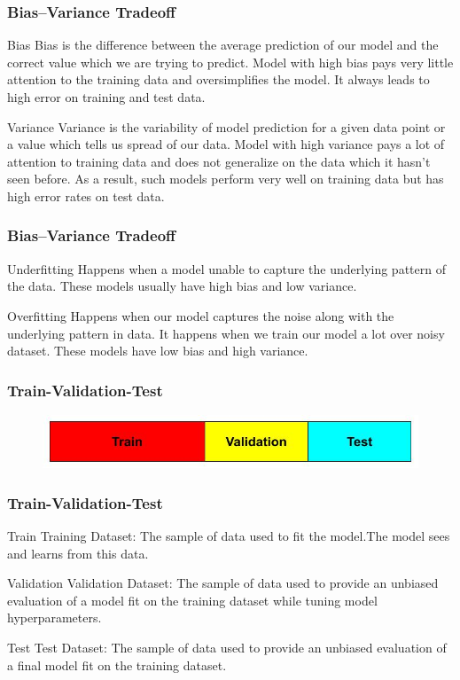 \documentclass{beamer}
\begin{document}
\begin{frame}
\frametitle{Bias–Variance Tradeoff}
\begin{block}{Bias}
Bias is the difference between the average prediction of our model and the correct value which we are trying to predict. Model with high bias pays very little attention to the training data and oversimplifies the model. It always leads to high error on training and test data.
\end{block}
\begin{block}{Variance}
Variance is the variability of model prediction for a given data point or a value which tells us spread of our data. Model with high variance pays a lot of attention to training data and does not generalize on the data which it hasn’t seen before. As a result, such models perform very well on training data but has high error rates on test data.
\end{block}
\end{frame}
\begin{frame}
\frametitle{Bias–Variance Tradeoff}
\begin{block}{Underfitting}
Happens when a model unable to capture the underlying pattern of the data. These models usually have high bias and low variance.
\end{block}
\begin{block}{Overfitting}
Happens when our model captures the noise along with the underlying pattern in data. It happens when we train our model a lot over noisy dataset. These models have low bias and high variance.
\end{block}
\end{frame}

\begin{frame}
\frametitle{Train-Validation-Test}
\begin{figure}[h]
 \centering
 \includegraphics[scale=0.3]{train-test.jpg}
\end{figure}
\end{frame}
\begin{frame}
\frametitle{Train-Validation-Test}
\begin{block}{Train}
Training Dataset: The sample of data used to fit the model.The model sees and learns from this data.
\end{block}
\begin{block}{Validation}
Validation Dataset: The sample of data used to provide an unbiased evaluation of a model fit on the training dataset while tuning model hyperparameters.
\end{block}
\begin{block}{Test}
Test Dataset: The sample of data used to provide an unbiased evaluation of a final model fit on the training dataset.
\end{block}
\end{frame}
\end{document}
